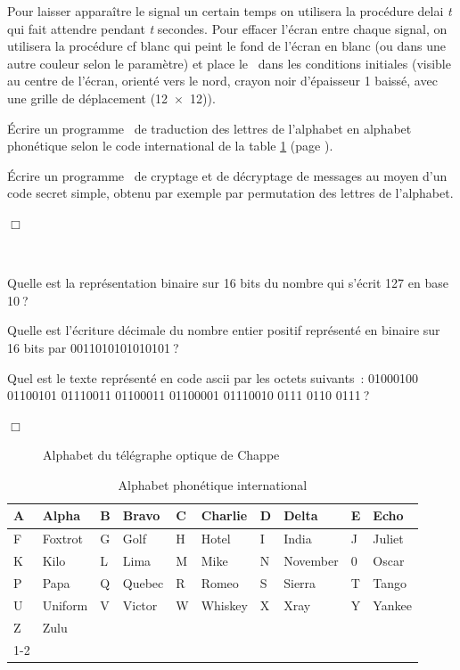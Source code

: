 \begin{exercices}
{  Pour laisser apparaître le signal un certain temps on utilisera la pro\-cé\-du\-re 
  {\idt delai {\rm\em t}} qui fait attendre pendant {\rm\em t} secondes. Pour effacer l'écran
  entre chaque signal, on utilisera la procédure {\idt cf blanc} qui peint le fond de l'écran
  en blanc (ou dans une autre couleur selon le paramètre) et place le \robot\ dans les conditions initiales
  (visible au centre de l'écran, or\-ien\-té vers le nord, crayon noir d'épaisseur 1 baissé, avec une grille 
  de déplacement (12~$\times$~12)).

  \tiret Écrire un programme \ocaml\ de traduction des lettres de l'alphabet en alphabet phonétique
  selon le code international de la table \ref{tab:alphone} (page \pageref{tab:alphone}).

   \tiret Écrire un programme \ocaml\ de cryptage et de décryptage de messages au moyen d'un code secret
   simple, obtenu par exemple par permutation des lettres de l'alphabet.

\noindent $\Box$}\end{exercices}
\begin{exercices}{\ \\
\vspace{-\baselineskip}

\tiret Quelle est la représentation binaire sur 16 bits du nombre qui s'écrit 127 
en base 10$\:$?

\tiret Quelle est l'écriture décimale du nombre entier positif re\-pré\-sen\-té
en binaire sur 16 bits par  0011010101010101$\:$?

\tiret Quel est le texte représenté en code {\sc ascii} par les octets suivants~:
01000100 01100101 01110011 01100011 01100001
01110010 0111 0110 0111$\:$?

\noindent $\Box$}\end{exercices}
\begin{figure}[htbp]
 \caption{Alphabet du télégraphe optique de Chappe}\label{fig:chappe}
\end{figure}
\begin{table}[htbp]
\begin{center}
\begin{tabular}{@{}|l|l||l|l||l|l||l|l||l|l|@{}} \hline
A & Alpha   & B  & Bravo & C & Charlie & D & Delta   & E  & Echo \\\hline
F & Foxtrot  & G & Golf   & H  & Hotel & I & India & J & Juliet \\\hline
K  & Kilo & L & Lima & M & Mike   & N  & November & 0 & Oscar \\\hline
P & Papa   & Q  & Quebec & R & Romeo  & S & Sierra   & T  & Tango \\\hline
U & Uniform & V & Victor   & W  & Whiskey & X & Xray & Y & Yankee   \\\hline
Z  & Zulu &   \multicolumn{8}{c}{}   \\\cline{1-2}
\end{tabular}
\end{center}
\caption{Alphabet phonétique international}\label{tab:alphone}
\end{table}
